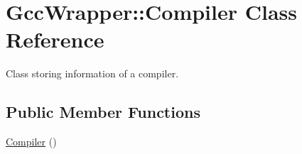 \hypertarget{classGccWrapper_1_1Compiler}{}\section{Gcc\+Wrapper\+:\+:Compiler Class Reference}
\label{classGccWrapper_1_1Compiler}


Class storing information of a compiler.  


\subsection*{Public Member Functions}
\begin{DoxyCompactItemize}
\item 
\hyperlink{classGccWrapper_1_1Compiler_a3fc3a8f20dac666133fd11f8480d07dc}{Compiler} ()
\end{DoxyCompactItemize}
